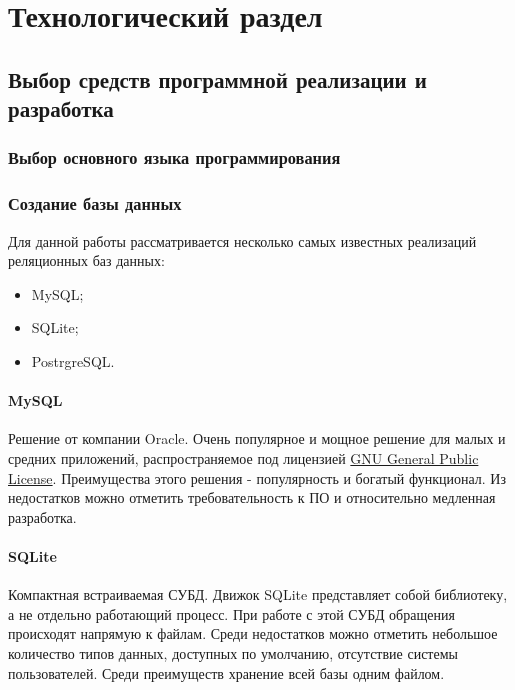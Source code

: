 \chapter{Технологический раздел}

%
\section{Выбор средств программной реализации и разработка}

\subsection{Выбор основного языка программирования}

\subsection{Создание базы данных}

Для данной работы рассматривается несколько самых известных реализаций реляционных баз данных:

\begin{itemize}
    \item MySQL;
    \item SQLite;
    \item PostrgreSQL.
\end{itemize}

\subsubsection{MySQL}

Решение от компании Oracle. Очень популярное и мощное решение для малых и средних приложений, распространяемое под лицензией \href{https://ru.wikipedia.org/wiki/GNU_General_Public_License}{GNU General Public License}. Преимущества этого решения - популярность и богатый функционал. Из недостатков можно отметить требовательность к ПО и относительно медленная разработка.

\subsubsection{SQLite}

Компактная встраиваемая СУБД. Движок SQLite представляет собой библиотеку, а не отдельно работающий процесс. При работе с этой СУБД обращения происходят напрямую к файлам. Среди недостатков можно отметить небольшое количество типов данных, доступных по умолчанию, отсутствие системы пользователей. Среди преимуществ хранение всей базы одним файлом.

